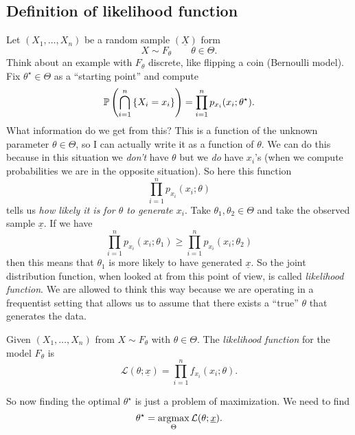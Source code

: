 \documentclass[12pt]{report}
\begin{document}
\subsection{Definition of likelihood function}
Let $(X_{1},\ldots,X_{n})$ be a random sample $(\underline{X})$ form
\begin{equation*}
	X\sim F_{\theta}\qquad \theta\in\Theta.
\end{equation*}
Think about an example with $F_{\theta}$ discrete, like flipping a coin (Bernoulli model). Fix $\theta^{\star}\in\Theta$ as a ``starting point'' and compute
\begin{equation*}
	\mathbb{P}\left(\bigcap_{i=1}^{n}\left\{X_{i}=x_{i}\right\}\right)=\prod_{i=1}^{n}p_{x_{i}}(x_{i};\theta^{\star}).
\end{equation*}
What information do we get from this? This is a function of the unknown parameter $\theta\in\Theta$, so I can actually write it as a function of $\theta$. We can do this because in this situation we \textit{don't} have $\theta$ but we \textit{do} have $x_{i}$'s (when we compute probabilities we are in the opposite situation). So here this function
\begin{equation*}
	\prod_{i=1}^{n}p_{x_{i}}(x_{i};\theta)
\end{equation*}
tells us \textit{how likely it is for $\theta$ to generate $x_{i}$}. Take $\theta_{1},\theta_{2}\in\Theta$ and take the observed sample $\underline{x}$. If we have
\begin{equation*}
	\prod_{i=1}^{n}p_{x_{i}}(x_{i};\theta_{1})\geq\prod_{i=1}^{n}p_{x_{i}}(x_{i};\theta_{2})
\end{equation*}
then this means that $\theta_{1}$ is more likely to have generated $\underline{x}$.
So the joint distribution function, when looked at from this point of view, is called \emph{likelihood function}. We are allowed to think this way because we are operating in a frequentist setting that allows us to assume that there exists a ``true'' $\theta$ that generates the data.
\begin{definition}
	Given $(X_{1},\ldots,X_{n})$ from $X\sim F_{\theta}$ with $\theta\in\Theta$. The \emph{likelihood function} for the model $F_{\theta}$ is
	\begin{equation*}
		\mathcal{L}(\theta;\underline{x})=\prod_{i=1}^{n}f_{x_{i}}(x_{i};\theta).
	\end{equation*}
\end{definition}
So now finding the optimal $\theta^{\star}$ is just a problem of maximization. We need to find
\begin{equation*}
	\theta^{\star}=\operatorname*{argmax}_{\Theta}\mathcal{L}(\theta;\underline{x}).
\end{equation*}
\end{document}

